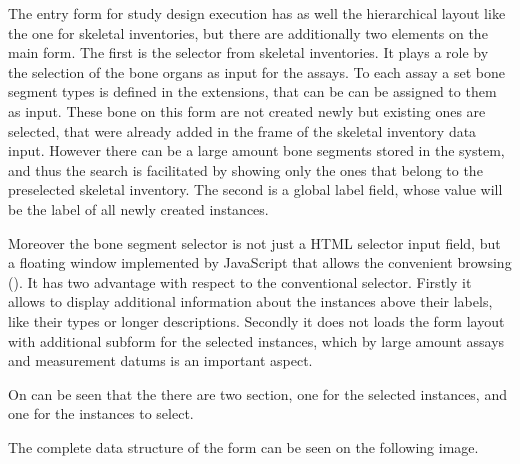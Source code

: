 The entry form for study design execution has as well the hierarchical layout like the one for skeletal inventories, but there are additionally two elements on the main form. The first is the selector from skeletal inventories. It plays a role by the selection of the bone organs as input for the assays. To each assay a set bone segment types is defined in the extensions, that can be can be assigned to them as input. These bone on this form are not created newly but existing ones are selected, that were already added in the frame of the skeletal inventory data input.  However there can be a large amount bone segments stored in the system, and thus the search is facilitated by showing only the ones that belong to the preselected skeletal inventory. The second is a global label field, whose value will be the label of all newly created instances.





Moreover the bone segment selector is not just a HTML selector input field, but a floating window implemented by JavaScript that allows the convenient browsing (). It has two advantage with respect to the conventional selector. Firstly it allows to display additional information about the instances above their labels, like their types or longer descriptions. Secondly it does not loads the form layout with additional subform for the selected instances, which by large amount assays and measurement datums is an important aspect.



On  can be seen that the there are two section, one for the selected instances, and one for the instances to select. 


The complete data structure of the form can be seen on the following image.



